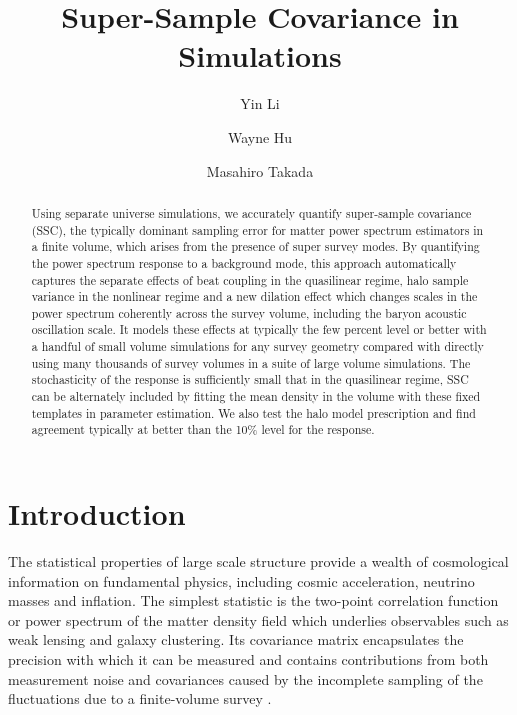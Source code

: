 \documentclass[prd,twocolumn,amsmath,amssymb,floatfix,superscriptaddress]{revtex4-1}
\begin{document}
\title{Super-Sample Covariance in Simulations}
\author{Yin Li}
\author{Wayne Hu}
\author{Masahiro Takada}
\begin{abstract}
Using separate universe simulations, we accurately quantify super-sample covariance (SSC), the typically dominant sampling error for
  matter power spectrum estimators in a finite volume, which  arises from the presence of super survey modes.  {By quantifying the power spectrum response to a background mode}, this approach automatically captures the separate effects of beat
coupling in the quasilinear regime, halo sample variance in the nonlinear regime and
a new dilation effect which changes scales in the power spectrum coherently across
the survey volume, including the baryon acoustic oscillation scale.   It models these effects at typically the few percent level or better with a handful of small
volume simulations for any survey geometry compared  with directly using
many thousands of survey volumes in a suite of large volume simulations.  The stochasticity of
the response is sufficiently small that in the quasilinear regime, SSC can be alternately
included by fitting the mean density in the volume with these fixed templates in parameter estimation.
{
We also test the halo model prescription and find agreement typically at better than the 10\% level for the response.}   
 \end{abstract}

\maketitle
\section{Introduction}

The statistical properties of large scale structure provide a wealth of cosmological
information on fundamental physics, including cosmic acceleration, neutrino masses and inflation.   The simplest
statistic  is the two-point correlation function or power spectrum of the  matter density field which underlies observables such as weak lensing and galaxy clustering.  
Its covariance matrix encapsulates the precision with which it can be measured and
contains contributions from both
measurement noise and  
covariances caused by the incomplete sampling of the fluctuations due to a
finite-volume survey \cite{MeiksinWhite:99,Scoccimarroetal:99,WhiteHu:00}. 
\end{document}
